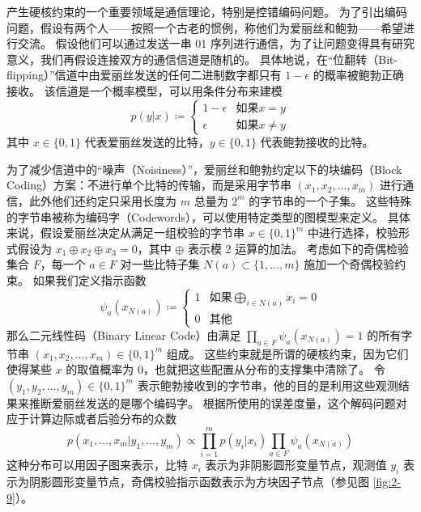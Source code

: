 \begin{tcolorbox}
\begin{exam}[带有硬约束的模型]

产生硬核约束的一个重要领域是通信理论，特别是控错编码问题。
为了引出编码问题，假设有两个人——按照一个古老的惯例，称他们为爱丽丝和鲍勃——希望进行交流。
假设他们可以通过发送一串 01 序列进行通信，为了让问题变得具有研究意义，我们再假设连接双方的通信信道是随机的。
具体地说，在“位翻转（Bit-flipping）”信道中由爱丽丝发送的任何二进制数字都只有 $1-\epsilon$ 的概率被鲍勃正确接收。
该信道是一个概率模型，可以用条件分布来建模
$$p(y|x) \coloneqq \begin{cases}
    1 - \epsilon &\text{如果} x = y \\
    \epsilon &\text{如果} x \neq y
\end{cases}$$
其中 $x \in \{0, 1\}$ 代表爱丽丝发送的比特，$y \in \{0, 1\}$ 代表鲍勃接收的比特。

为了减少信道中的“噪声（Noisiness）”，爱丽丝和鲍勃约定以下的块编码（Block Coding）方案：不进行单个比特的传输，而是采用字节串 $(x_1, x_2, \dots, x_m)$ 进行通信，此外他们还约定只采用长度为 $m$ 总量为 $2^m$ 的字节串的一个子集。
这些特殊的字节串被称为编码字（Codewords），可以使用特定类型的图模型来定义。
具体来说，假设爱丽丝决定从满足一组校验的字节串 $x \in \{0, 1\}^m$ 中进行选择，校验形式假设为 $x_1 \oplus x_2 \oplus x_3 = 0$，其中 $\oplus$ 表示模 2 运算的加法。
考虑如下的奇偶检验集合 $F$，每一个 $a \in F$ 对一些比特子集 $N(a) \subset \{1, \dots, m\}$ 施加一个奇偶校验约束。
如果我们定义指示函数
\begin{equation}
    \psi_a(x_{N(a)}) \coloneqq \begin{cases}
        1 &\text{如果} \bigoplus_{i \in N(a)}x_i = 0 \\
        0 &\text{其他}
    \end{cases}
\end{equation}
那么二元线性码（Binary Linear Code）由满足 $\prod_{a \in F}\psi_a(x_{N(a)}) = 1$ 的所有字节串 $(x_1, x_2, \dots, x_m) \in \{0, 1\}^m$ 组成。
这些约束就是所谓的硬核约束，因为它们使得某些 $x$ 的取值概率为 0，也就把这些配置从分布的支撑集中清除了。
令 $(y_1, y_2, \dots, y_m) \in \{0, 1\}^m$ 表示鲍勃接收到的字节串，他的目的是利用这些观测结果来推断爱丽丝发送的是哪个编码字。
根据所使用的误差度量，这个解码问题对应于计算边际或者后验分布的众数
\begin{equation}
    p(x_1, \dots, x_m|y_1, \dots, y_m) \propto \prod_{i = 1}^mp(y_i|x_i)\prod_{a \in F}\psi_a(x_{N(a)})
\end{equation}
这种分布可以用因子图来表示，比特 $x_i$ 表示为非阴影圆形变量节点，观测值 $y_i$ 表示为阴影圆形变量节点，奇偶校验指示函数表示为方块因子节点（参见图 \ref{fig:2-9}）。


\end{exam}
\end{tcolorbox}
